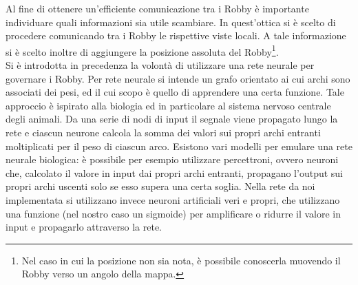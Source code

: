 Al fine di ottenere un'efficiente comunicazione tra i Robby è importante
individuare quali informazioni sia utile scambiare. In quest'ottica si è scelto
di procedere comunicando tra i Robby le rispettive viste locali. A tale
informazione si è scelto inoltre di aggiungere la posizione assoluta del
Robby\footnote{Nel caso in cui la posizione non sia nota, è possibile conoscerla
muovendo il Robby verso un angolo della mappa.}.\\

Si è introdotta in precedenza la volontà di utilizzare una rete neurale per
governare i Robby. Per rete neurale si intende un grafo orientato ai cui archi 
sono associati dei pesi, ed il cui scopo è quello di apprendere una certa 
funzione. Tale approccio è ispirato alla biologia ed in particolare al sistema 
nervoso centrale degli animali. Da una serie di nodi di input il segnale viene 
propagato lungo la rete e ciascun neurone calcola la somma dei valori sui 
propri archi entranti moltiplicati per il peso di ciascun arco. Esistono vari 
modelli per emulare una rete neurale biologica: è possibile per esempio 
utilizzare percettroni, ovvero neuroni che, calcolato il valore in input dai 
propri archi entranti, propagano l'output sui propri archi uscenti solo se esso 
supera una certa soglia. Nella rete da noi implementata si utilizzano invece 
neuroni artificiali veri e propri, che utilizzano una funzione (nel nostro caso 
un sigmoide) per amplificare o ridurre il valore in input e propagarlo 
attraverso la rete.
\\



